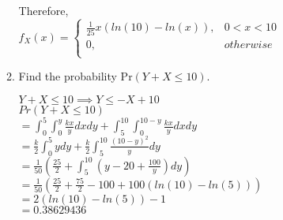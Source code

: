 \documentclass[11pt]{article}
\newcommand{\pr}{\text{Pr}}
\begin{document}
\begin{enumerate}[label=\textbf{Question \arabic*:},start=1]
\begin{enumerate}
	Therefore, \\
	$f_X(x) = \begin{cases}
		\frac{1}{25} x (ln(10) - ln(x)), & 0 < x <10 \\ 
		0, & otherwise\\
		\end{cases}$\\
	

	\item Find the probability $\pr(Y + X \leq 10)$.
	
	$Y + X \leq 10 \implies Y \leq -X + 10$\\
	
	$Pr(Y + X \leq 10) $ \\
	$ = \displaystyle{ \int_{0}^{5} \int_{0}^{y} \frac{kx}{y} dx dy + \int_{5}^{10} \int_{0}^{10-y} \frac{kx}{y} dx dy }$ \\
	$ = \displaystyle{ \frac{k}{2} \int_{0}^{5} y dy + \frac{k}{2} \int_{5}^{10} \frac{(10-y)^2}{y} dy }$ \\
	$ = \displaystyle{ \frac{1}{50} (\frac{25}{2} + \int_{5}^{10} (y - 20 + \frac{100}{y}) dy) }$ \\
	$ = \displaystyle{ \frac{1}{50} (\frac{25}{2} + \frac{75}{2} - 100 + 100(ln(10) - ln(5))) }$ \\
	$ = \displaystyle{ 2(ln(10) - ln(5)) - 1 }$ \\
	$ = \displaystyle{ 0.38629436 }$
	


\end{enumerate}

\end{enumerate}
\end{document}

